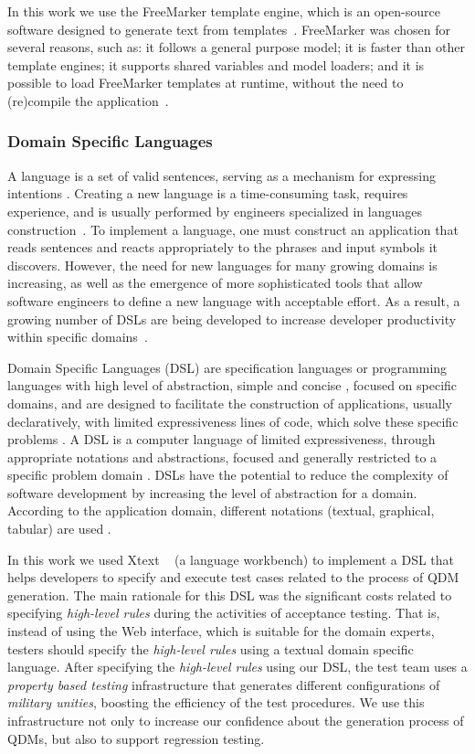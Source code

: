 \documentclass[AMA,STIX1COL,hidelinks]{WileyNJD-v2}
\newcommand{\callers}{\emph{high-level rules}\xspace}
\begin{document}
In this work we use the FreeMarker template engine, which is an open-source software designed to generate text from templates~\cite{radjenovic2009}. FreeMarker was chosen for several reasons, such as: it follows a general purpose model; it is faster than other template engines; it supports shared variables and model loaders; and it is possible to load FreeMarker templates at runtime, without the need to (re)compile the application~\cite{benato2017,parr2006}.


\subsubsection{Domain Specific Languages}

A language is a set of valid sentences, serving as a mechanism for expressing intentions \cite{parr2010}. Creating a new language is a time-consuming task, requires experience, and is usually performed by engineers specialized in languages construction~\cite{karsai2014}. To implement a language, one must construct an application that reads sentences and reacts appropriately to the phrases and input symbols it discovers. However, the need for new languages for many growing domains is increasing, as well as the emergence of more sophisticated tools that allow software engineers to define a new language with acceptable effort. As a result, a growing number of DSLs are being developed to increase developer productivity within specific domains~\cite{karsai2014}. 


Domain Specific Languages (DSL) are specification languages or programming languages with high level of abstraction, simple and concise \cite{raja2010}, focused on specific domains, and are designed to facilitate the construction of applications, usually declaratively, with limited expressiveness lines of code, which solve these specific problems \cite{neeraj2017}. A DSL is a computer language of limited expressiveness, through appropriate notations and abstractions, focused and generally restricted to a specific problem domain \cite{fowler2013,vanDeursen2000}. DSLs have the potential to reduce the complexity of software development by increasing the level of abstraction for a domain. According to the application domain, different notations (textual, graphical, tabular) are used \cite{pfeiffer2008}.


In this work we used Xtext ~\cite{eysholdt2010} (a language workbench) to implement a DSL that helps developers to specify and execute test cases related to the process of QDM generation. The main rationale for this DSL was the significant costs related to specifying \callers during the activities of acceptance testing.
{\color{blue}That is, instead of using the Web interface, which is suitable for the domain experts, testers should specify the \callers using a textual domain specific language. After specifying the \callers using our DSL, the test team 
  uses a \emph{property based testing} infrastructure that
  generates different configurations of \emph{military unities}, boosting the
  efficiency of the test procedures}. We use
this infrastructure not only to increase our confidence
about the generation process of
QDMs, but also to support regression testing.
\end{document}
